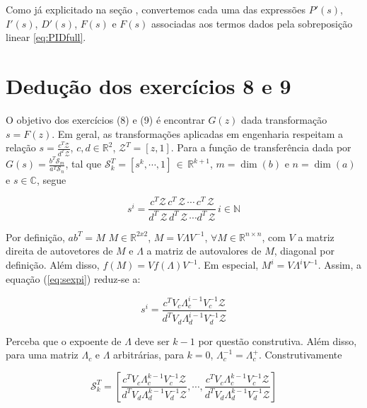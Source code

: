 \documentclass[twoside, fleqn]{article}
\begin{document}
    Como já explicitado na seção \emph{}, convertemos cada uma das expressões $P'(s)$, $I'(s)$, $D'(s)$, $F(s)$ e $F(s)$ associadas aos termos dados pela sobreposição linear \eqref{eq:PIDfull}.

\section*{Dedução dos exercícios 8 e 9}
\label{sec:deducao89}

    O objetivo dos exercícios (8) e (9) é encontrar $G(z)$ dada transformação $s = F(z)$. Em geral, as transformações aplicadas em engenharia respeitam a relação $s = \frac{c^T \mathcal{Z}}{d^T \mathcal{Z}}$, $c, d \in \mathbb{R}^2$, $\mathcal{Z}^T = [z, 1] $. Para a função de transferência dada por $G(s) = \frac{b^T \mathcal{S}_m}{a^T \mathcal{S}_n}$, tal que $\mathcal{S}_k^T = [s^k, \cdots, 1]  \, \in \, \mathbb{R}^{k+1}$, $m = \dim(b)$ e $n = \dim(a)$ e $s \in \mathbb{C}$, segue
    
    \begin{equation}
        s^i = \frac{c^T \mathcal{Z} \, c^T \, \mathcal{Z} \, \cdots \, c^T \, \mathcal{Z}}{d^T \, \mathcal{Z} \, d^T \, \mathcal{Z} \, \cdots d^T \, \mathcal{Z}} \, i \in \mathbb{N}
        \label{eq:sexpi}
    \end{equation}
    
    Por definição, $a b^T = M \,\, M \in \mathbb{R}^{2x2}$, $M = V \Lambda V^{-1}$, $\forall M \in \mathbb{R}^{n \times n}$, com $V$ a matriz direita de autovetores de $M$ e $\Lambda$ a matriz de autovalores de $M$, diagonal por definição. Além disso, $f(M) = V f(\Lambda) V^{-1}$. Em especial, $M^i = V \Lambda^i V^{-1}$. Assim, a equação (\ref{eq:sexpi}) reduz-se a:
    
    \begin{equation}
        s^i = \frac{c^T V_c \Lambda_c^{i-1} V_c^{-1} \mathcal{Z}}{d^T V_d \Lambda_d^{i-1} V_d^{-1} \mathcal{Z}}
    \end{equation}
    
    Perceba que o expoente de $\Lambda$ deve ser $k - 1$ por questão construtiva. Além disso, para uma matriz $\Lambda_c$ e $\Lambda$ arbitrárias, para $k = 0$, $\Lambda_c^{-1} = \Lambda_c^{+}$. Construtivamente
    
    \begin{equation}
        \mathcal{S}_k^T = \left[\frac{c^T V_c \Lambda_c^{k-1} V_c^{-1} \mathcal{Z}}{d^T V_d \Lambda_d^{k-1} V_d^{-1} \mathcal{Z}}, \cdots, \frac{c^T V_c \Lambda_c^{k-1} V_c^{-1} \mathcal{Z}}{d^T V_d \Lambda_d^{k-1} V_d^{-1} \mathcal{Z}}\right]
    \end{equation}
    
\end{document}
